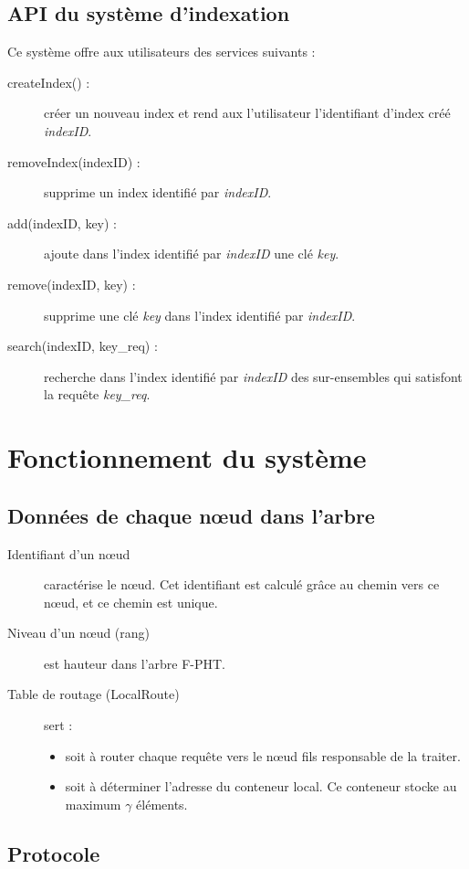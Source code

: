 \documentclass[a4paper,11pt]{report}
\begin{document}
\section{API du système d'indexation}
	Ce système offre aux utilisateurs des services suivants :
	\begin{description}
		\item[	createIndex() 	 :] créer un nouveau index et rend aux l'utilisateur l'identifiant d'index créé \textit{indexID}.
		\item[	removeIndex(indexID)	 :] supprime un index identifié par \textit{indexID}.
		\item[	add(indexID, key) 		 :] ajoute dans l'index identifié par \textit{indexID} une clé \textit{key}.
		\item[	remove(indexID, key)  :] supprime une clé \textit{key} dans l'index identifié par \textit{indexID}.
		\item[	search(indexID, key\_req) 	 :] recherche dans l'index identifié par \textit{indexID} des sur-ensembles qui satisfont la requête \textit{key\_req}.
	\end{description}

	
\chapter{Fonctionnement du système}
\section{Données de chaque nœud dans l'arbre}
	\begin{description}
		\item[Identifiant d'un nœud] caractérise le nœud. Cet identifiant est calculé grâce au chemin vers ce nœud, et ce chemin est unique.
		\item[Niveau d'un nœud (rang)]  est hauteur dans l'arbre F-PHT.
		\item[Table de routage (LocalRoute)] sert :
			\begin{itemize}
				\item soit à router chaque requête vers le nœud fils responsable de la traiter.
				\item soit à déterminer l'adresse du conteneur local. Ce conteneur stocke au maximum $\gamma$ éléments.
			\end{itemize}
	\end{description}


\section{Protocole}
\end{document}
